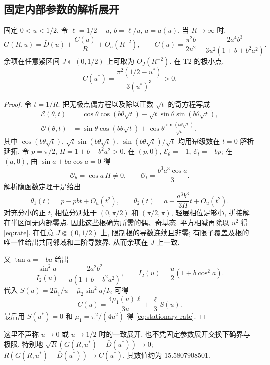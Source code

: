 \subsection{固定内部参数的解析展开}\label{sec:fixed-u}
\begin{proposition}\label{prop:fixed-u}
固定 $0<u<1/2$, 令 $\ell=1/2-u$, $b=\ell/u$, $a=a(u)$.
当 $R\to\infty$ 时,
\begin{equation}
 G(R,u)=\bar D(u)+\frac{C(u)}R+O_u(R^{-2}),\qquad
 C(u)=\frac{\pi^2b}{2u^2}-\frac{2a^4b^3}{3u^2(1+b+b^2a^2)}.\label{eq:rate}
\end{equation}
余项在任意紧区间 $J\Subset(0,1/2)$ 上可取为 $O_J(R^{-2})$.
在 T2 的极小点,
\begin{equation}
 C(u^*)=\frac{\pi^2(1/2-u^*)}{3(u^*)^3}>0.\label{eq:stationary-rate}
\end{equation}
\end{proposition}
\begin{proof}
令 $t=1/R$. 把无极点偶方程以及除以正数 $\sqrt t$ 的奇方程写成
\begin{align*}
 \mathcal E(\theta,t)&=\cos\theta\cos(b\theta\sqrt t)
 -\sqrt t\sin\theta\sin(b\theta\sqrt t),\\
 \mathcal O(\theta,t)&=\sin\theta\cos(b\theta\sqrt t)
 +\cos\theta\frac{\sin(b\theta\sqrt t)}{\sqrt t}.
\end{align*}
其中 $\cos(b\theta\sqrt t)$, $\sqrt t\sin(b\theta\sqrt t)$,
$\sin(b\theta\sqrt t)/\sqrt t$ 均用幂级数在 $t=0$ 解析延拓.
令 $p=\pi/2$, $H=1+b+b^2a^2>0$. 在 $(p,0)$,
$\mathcal E_\theta=-1$, $\mathcal E_t=-bp$;
在 $(a,0)$, 由 $\sin a+ba\cos a=0$ 得
\[
 \mathcal O_\theta=\cos a\,H\ne0,\qquad
 \mathcal O_t=\frac{b^3a^3\cos a}{3}.
\]
解析隐函数定理于是给出
\[
 \theta_1(t)=p-pbt+O_u(t^2),\qquad
 \theta_2(t)=a-\frac{a^3b^3}{3H}t+O_u(t^2).
\]
对充分小的正 $t$, 相位分别处于 $(0,\pi/2)$ 和 $(\pi/2,\pi)$,
轻层相位足够小, 拼接解在半区间无内部零点. 因此这些根确为所需的偶、奇基态.
平方相减再除以 $u^2$ 得 \eqref{eq:rate}.
在任意 $J\Subset(0,1/2)$ 上, 限制根的导数连续且非零;
有限子覆盖及根的唯一性给出共同邻域和二阶导数界, 从而余项在 $J$ 上一致.

又 $\tan a=-ba$ 给出
\[
 \frac{\sin^2a}{I_2(u)}=\frac{2a^2b^2}{u(1+b+b^2a^2)},\qquad
 I_2(u)=\frac u2(1+b\cos^2a).
\]
代入 $S(u)=2\bar\mu_1/u-\bar\mu_2\sin^2a/I_2$ 可得
\[
 C(u)=\frac{4\bar\mu_1(u)\ell}{3u}+\frac\ell3S(u).
\]
最后用 $S(u^*)=0$ 和 $\bar\mu_1=\pi^2/(4u^2)$ 得 \eqref{eq:stationary-rate}.
\end{proof}
这里不声称 $u\to0$ 或 $u\to1/2$ 时的一致展开, 也不凭固定参数展开交换下确界与极限.
特别地 $\sqrt R(G(R,u^*)-\bar D(u^*))\to0$;
$R(G(R,u^*)-\bar D(u^*))\to C(u^*)$, 其数值约为 $15.5807908501$.

